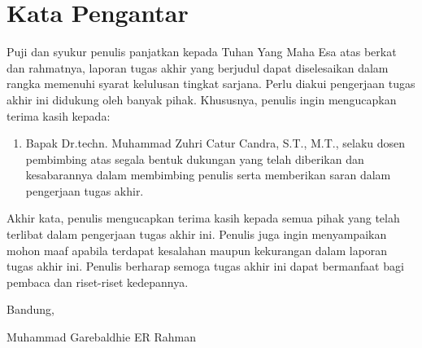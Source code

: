 \chapter*{Kata Pengantar}

Puji dan syukur penulis panjatkan kepada Tuhan Yang Maha Esa atas berkat dan rahmatnya, laporan tugas akhir yang berjudul \thetitle{} dapat diselesaikan dalam rangka memenuhi syarat kelulusan tingkat sarjana. Perlu diakui pengerjaan tugas akhir ini didukung oleh banyak pihak. Khususnya, penulis ingin mengucapkan terima kasih kepada:

\begin{enumerate}
    \item Bapak Dr.techn. Muhammad Zuhri Catur Candra, S.T., M.T., selaku dosen pembimbing atas segala bentuk dukungan yang telah diberikan dan kesabarannya dalam membimbing penulis serta memberikan saran dalam pengerjaan tugas akhir.
\end{enumerate}

Akhir kata, penulis mengucapkan terima kasih kepada semua pihak yang telah terlibat dalam pengerjaan tugas akhir ini. Penulis juga ingin menyampaikan mohon maaf apabila terdapat kesalahan maupun kekurangan dalam laporan tugas akhir ini. Penulis berharap semoga tugas akhir ini dapat bermanfaat bagi pembaca dan riset-riset kedepannya.

\begin{flushright}
    \vspace{0.5cm}
    Bandung, \tanggalpengesahan


    \vspace{1.5cm}

    Muhammad Garebaldhie ER Rahman
\end{flushright}